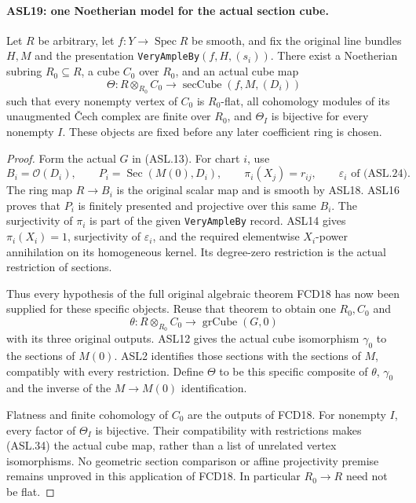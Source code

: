 \paragraph{ASL19: one Noetherian model for the actual section cube.}
\label{claim:ASL19}
Let $R$ be arbitrary, let $f:Y\to\operatorname{Spec}R$ be
smooth, and fix the original line bundles $H,M$ and the
presentation \texttt{Very\allowbreak{}Ample\allowbreak{}By}$(f,H,(s_i))$.
There exist a Noetherian subring $R_0\subseteq R$, a cube
$C_0$ over $R_0$, and an actual cube map
\[
 \Theta:R\otimes_{R_0}C_0
                       \longrightarrow\operatorname{secCube}(f,M,(D_i))
                                                        \tag{ASL.34}
\]
such that every nonempty vertex of $C_0$ is $R_0$-flat,
all cohomology modules of its unaugmented \v Cech complex
are finite over $R_0$, and $\Theta_I$ is bijective for every
nonempty $I$.  These objects are fixed before any later
coefficient ring is chosen.

\begin{proof}
Form the actual $G$ in (ASL.13).  For chart $i$, use
\[
 B_i=\mathcal O(D_i),\qquad
 P_i=\operatorname{Sec}(M(0),D_i),\qquad
 \pi_i(X_j)=r_{ij},\qquad \varepsilon_i\text{ of (ASL.24)}.
\]
The ring map $R\to B_i$ is the original scalar map and is
smooth by ASL18.  ASL16 proves that $P_i$ is finitely
presented and projective over this same $B_i$.
The surjectivity of $\pi_i$ is part of the given
\texttt{Very\allowbreak{}Ample\allowbreak{}By} record.  ASL14 gives
$\pi_i(X_i)=1$, surjectivity of $\varepsilon_i$, and the
required elementwise $X_i$-power annihilation on its
homogeneous kernel.  Its degree-zero restriction is the
actual restriction of sections.

Thus every hypothesis of the full original algebraic theorem
FCD18 has now been supplied for these specific objects.
Reuse that theorem to obtain one $R_0,C_0$ and
\[
          \theta:R\otimes_{R_0}C_0
                          \longrightarrow\operatorname{grCube}(G,0)
\]
with its three original outputs.  ASL12 gives the actual
cube isomorphism $\gamma_0$ to the sections of $M(0)$.
ASL2 identifies those sections with the sections of $M$,
compatibly with every restriction.  Define $\Theta$ to be
this specific composite of $\theta$, $\gamma_0$ and the
inverse of the $M\to M(0)$ identification.

Flatness and finite cohomology of $C_0$ are the outputs of
FCD18.  For nonempty $I$, every factor of $\Theta_I$ is
bijective.  Their compatibility with restrictions makes
(ASL.34) the actual cube map, rather than a list of unrelated
vertex isomorphisms.  No geometric section comparison or
affine projectivity premise remains unproved in this application
of FCD18.  In particular $R_0\to R$ need not be flat.
\end{proof}

